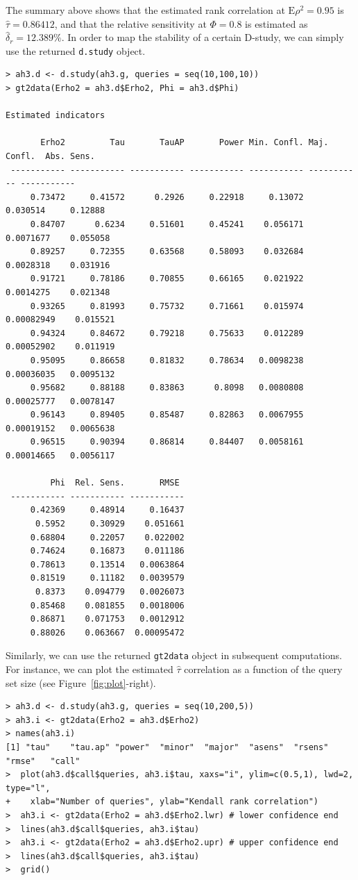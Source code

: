 \documentclass[twoside]{article}
\begin{document}
The summary above shows that the estimated rank correlation at $\text{E}\rho^2=0.95$ is $\hat\tau=0.86412$, and that the relative sensitivity at $\Phi=0.8$ is estimated as $\hat\delta_r=12.389\%$.
In order to map the stability of a certain D-study, we can simply use the returned \texttt{d.study} object.
{\small\begin{verbatim}
> ah3.d <- d.study(ah3.g, queries = seq(10,100,10))
> gt2data(Erho2 = ah3.d$Erho2, Phi = ah3.d$Phi)

Estimated indicators

       Erho2         Tau       TauAP       Power Min. Confl. Maj. Confl.  Abs. Sens.
 ----------- ----------- ----------- ----------- ----------- ----------- -----------
     0.73472     0.41572      0.2926     0.22918     0.13072    0.030514     0.12888 
     0.84707      0.6234     0.51601     0.45241    0.056171   0.0071677    0.055058 
     0.89257     0.72355     0.63568     0.58093    0.032684   0.0028318    0.031916 
     0.91721     0.78186     0.70855     0.66165    0.021922   0.0014275    0.021348 
     0.93265     0.81993     0.75732     0.71661    0.015974  0.00082949    0.015521 
     0.94324     0.84672     0.79218     0.75633    0.012289  0.00052902    0.011919 
     0.95095     0.86658     0.81832     0.78634   0.0098238  0.00036035   0.0095132 
     0.95682     0.88188     0.83863      0.8098   0.0080808  0.00025777   0.0078147 
     0.96143     0.89405     0.85487     0.82863   0.0067955  0.00019152   0.0065638 
     0.96515     0.90394     0.86814     0.84407   0.0058161  0.00014665   0.0056117 

         Phi  Rel. Sens.       RMSE
 ----------- ----------- -----------
     0.42369     0.48914     0.16437 
      0.5952     0.30929    0.051661 
     0.68804     0.22057    0.022002 
     0.74624     0.16873    0.011186 
     0.78613     0.13514   0.0063864 
     0.81519     0.11182   0.0039579 
      0.8373    0.094779   0.0026073 
     0.85468    0.081855   0.0018006 
     0.86871    0.071753   0.0012912 
     0.88026    0.063667  0.00095472 
\end{verbatim}}

Similarly, we can use the returned \texttt{gt2data} object in subsequent computations. For instance, we can plot the estimated $\hat\tau$ correlation as a function of the query set size (see Figure~\ref{fig:plot}-right).

{\small\begin{verbatim}
> ah3.d <- d.study(ah3.g, queries = seq(10,200,5))
> ah3.i <- gt2data(Erho2 = ah3.d$Erho2)
> names(ah3.i)
[1] "tau"    "tau.ap" "power"  "minor"  "major"  "asens"  "rsens"  "rmse"   "call"  
>  plot(ah3.d$call$queries, ah3.i$tau, xaxs="i", ylim=c(0.5,1), lwd=2, type="l",
+    xlab="Number of queries", ylab="Kendall rank correlation")
>  ah3.i <- gt2data(Erho2 = ah3.d$Erho2.lwr) # lower confidence end
>  lines(ah3.d$call$queries, ah3.i$tau)
>  ah3.i <- gt2data(Erho2 = ah3.d$Erho2.upr) # upper confidence end
>  lines(ah3.d$call$queries, ah3.i$tau)
>  grid()
\end{verbatim}}



\end{document}
